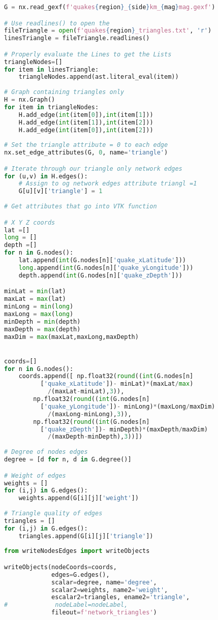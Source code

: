 \documentclass[12pt, twoside]{report}
\begin{document}
\begin{appendices}
\begin{lstlisting}[language=python, frame=single, tabsize=1]
G = nx.read_gexf(f'quakes{region}_{side}km_{mag}mag.gexf')

# Use readlines() to open the 
fileTriangle = open(f'quakes{region}_triangles.txt', 'r')
linesTriangle = fileTriangle.readlines()

# Properly evaluate the Lines to get the Lists
triangleNodes=[]
for item in linesTriangle:
    triangleNodes.append(ast.literal_eval(item))
    
# Graph containing triangles only
H = nx.Graph()
for item in triangleNodes:
    H.add_edge(int(item[0]),int(item[1]))
    H.add_edge(int(item[1]),int(item[2]))
    H.add_edge(int(item[0]),int(item[2]))
    
# Set the triangle attribute = 0 to each edge
nx.set_edge_attributes(G, 0, name='triangle')

# Iterate through our triangle only network edges
for (u,v) in H.edges():
    # Assign to og network edges attribute triangl =1
    G[u][v]['triangle'] = 1
    
# Get attributes that go into VTK function

# X Y Z coords
lat =[]
long = []
depth =[]
for n in G.nodes():
    lat.append(int(G.nodes[n]['quake_xLatitude']))
    long.append(int(G.nodes[n]['quake_yLongitude']))
    depth.append(int(G.nodes[n]['quake_zDepth']))

minLat = min(lat)
maxLat = max(lat)
minLong = min(long)
maxLong = max(long)
minDepth = min(depth)
maxDepth = max(depth)
maxDim = max(maxLat,maxLong,maxDepth)


coords=[]
for n in G.nodes():
    coords.append([ np.float32(round((int(G.nodes[n]
    	  ['quake_xLatitude'])- minLat)*(maxLat/max)
    	    /(maxLat-minLat),3)),
        np.float32(round((int(G.nodes[n]
          ['quake_yLongitude'])- minLong)*(maxLong/maxDim)
            /(maxLong-minLong),3)),
        np.float32(round((int(G.nodes[n]
          ['quake_zDepth'])- minDepth)*(maxDepth/maxDim)
            /(maxDepth-minDepth),3))])
  
# Degree of nodes edges    
degree = [d for n, d in G.degree()]

# Weight of edges
weights = []
for (i,j) in G.edges():
    weights.append(G[i][j]['weight'])
    
# Triangle quality of edges
triangles = []
for (i,j) in G.edges():
    triangles.append(G[i][j]['triangle'])   
    
from writeNodesEdges import writeObjects

writeObjects(nodeCoords=coords,
             edges=G.edges(),
             scalar=degree, name='degree',
             scalar2=weights, name2='weight',
             escalar2=triangles, ename2='triangle',
#             nodeLabel=nodeLabel,
             fileout=f'network_triangles')
\end{lstlisting}



\end{appendices}
\end{document}
